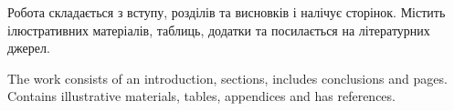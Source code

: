 Робота складається з вступу,   розділів та висновків і налічує  сторінок.
Містить  ілюстративних матеріалів,  таблиць,  додатки та
посилається на  літературних джерел.

\clearpage

The work consists of an introduction,  sections, includes conclusions and  pages.
Contains  illustrative materials,  tables,  appendices and has
 references.

